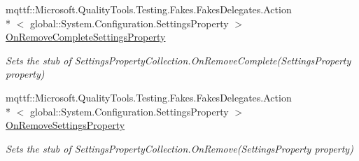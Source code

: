 \begin{DoxyCompactItemize}
mqttf\-::\-Microsoft.\-Quality\-Tools.\-Testing.\-Fakes.\-Fakes\-Delegates.\-Action\\*
$<$ global\-::\-System.\-Configuration.\-Settings\-Property $>$ \hyperlink{class_system_1_1_configuration_1_1_fakes_1_1_stub_settings_property_collection_a198768502777d88a6bb898774be0c091}{On\-Remove\-Complete\-Settings\-Property}
\begin{DoxyCompactList}\small\item\em Sets the stub of Settings\-Property\-Collection.\-On\-Remove\-Complete(\-Settings\-Property property)\end{DoxyCompactList}\item 
mqttf\-::\-Microsoft.\-Quality\-Tools.\-Testing.\-Fakes.\-Fakes\-Delegates.\-Action\\*
$<$ global\-::\-System.\-Configuration.\-Settings\-Property $>$ \hyperlink{class_system_1_1_configuration_1_1_fakes_1_1_stub_settings_property_collection_a96ef2ff5daf48c10e5484f9637661e28}{On\-Remove\-Settings\-Property}
\begin{DoxyCompactList}\small\item\em Sets the stub of Settings\-Property\-Collection.\-On\-Remove(\-Settings\-Property property)\end{DoxyCompactList}\end{DoxyCompactItemize}
